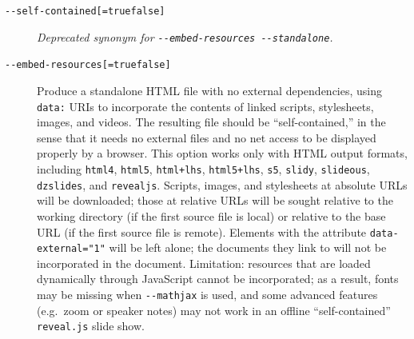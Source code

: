 \documentclass[
  b5paper
]{book}
\begin{document}
\begin{description}
\item[\texttt{-\/-self-contained{[}=true\textbar{}false{]}}]
\emph{Deprecated synonym for
\texttt{-\/-embed-resources\ -\/-standalone}.}
\item[\texttt{-\/-embed-resources{[}=true\textbar{}false{]}}]
Produce a standalone HTML file with no external dependencies, using
\texttt{data:} URIs to incorporate the contents of linked scripts,
stylesheets, images, and videos. The resulting file should be
``self-contained,'' in the sense that it needs no external files and no
net access to be displayed properly by a browser. This option works only
with HTML output formats, including \texttt{html4}, \texttt{html5},
\texttt{html+lhs}, \texttt{html5+lhs}, \texttt{s5}, \texttt{slidy},
\texttt{slideous}, \texttt{dzslides}, and \texttt{revealjs}. Scripts,
images, and stylesheets at absolute URLs will be downloaded; those at
relative URLs will be sought relative to the working directory (if the
first source file is local) or relative to the base URL (if the first
source file is remote). Elements with the attribute
\texttt{data-external="1"} will be left alone; the documents they link
to will not be incorporated in the document. Limitation: resources that
are loaded dynamically through JavaScript cannot be incorporated; as a
result, fonts may be missing when \texttt{-\/-mathjax} is used, and some
advanced features (e.g.~zoom or speaker notes) may not work in an
offline ``self-contained'' \texttt{reveal.js} slide show.


\end{description}
\end{document}
